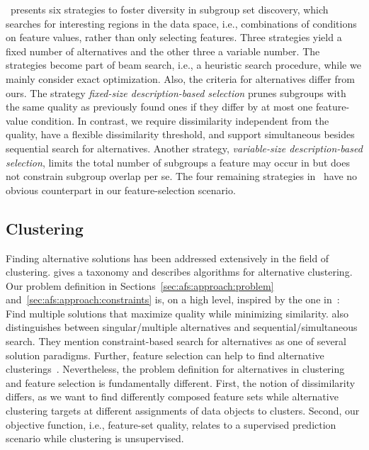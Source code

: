 \documentclass{article}
\theoremstyle{definition}
\begin{document}
\cite{leeuwen2012diverse}~presents six strategies to foster diversity in subgroup set discovery, which searches for interesting regions in the data space, i.e., combinations of conditions on feature values, rather than only selecting features.
Three strategies yield a fixed number of alternatives and the other three a variable number.
The strategies become part of beam search, i.e., a heuristic search procedure, while we mainly consider exact optimization.
Also, the criteria for alternatives differ from ours.
The strategy \emph{fixed-size description-based selection} prunes subgroups with the same quality as previously found ones if they differ by at most one feature-value condition.
In contrast, we require dissimilarity independent from the quality, have a flexible dissimilarity threshold, and support simultaneous besides sequential search for alternatives.
Another strategy, \emph{variable-size description-based selection}, limits the total number of subgroups a feature may occur in but does not constrain subgroup overlap per se.
The four remaining strategies in~\cite{leeuwen2012diverse} have no obvious counterpart in our feature-selection scenario.

\subsection{Clustering}
\label{sec:afs:related-work:clustering}

Finding alternative solutions has been addressed extensively in the field of clustering.
\cite{bailey2014alternative} gives a taxonomy and describes algorithms for alternative clustering.
Our problem definition in Sections~\ref{sec:afs:approach:problem} and~\ref{sec:afs:approach:constraints} is, on a high level, inspired by the one in~\cite{bailey2014alternative}:
Find multiple solutions that maximize quality while minimizing similarity.
\cite{bailey2014alternative} also distinguishes between singular/multiple alternatives and sequential/simultaneous search.
They mention constraint-based search for alternatives as one of several solution paradigms.
Further, feature selection can help to find alternative clusterings~\cite{tao2012novel}.
Nevertheless, the problem definition for alternatives in clustering and feature selection is fundamentally different.
First, the notion of dissimilarity differs, as we want to find differently composed feature sets while alternative clustering targets at different assignments of data objects to clusters.
Second, our objective function, i.e., feature-set quality, relates to a supervised prediction scenario while clustering is unsupervised.
\end{document}

